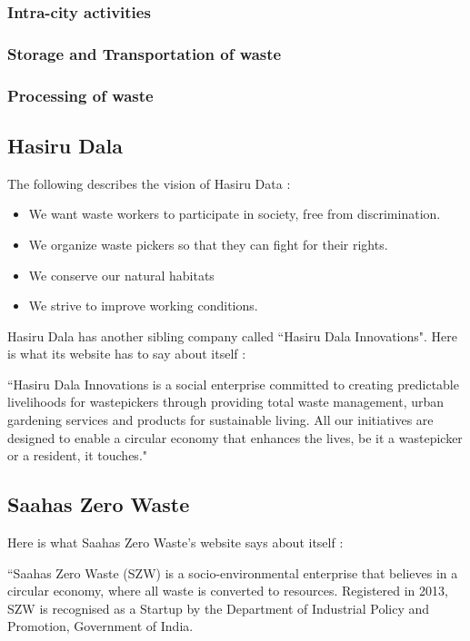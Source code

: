\documentclass[10pt]{article}
\begin{document}
\subsubsection{Intra-city activities}

\subsubsection{Storage and Transportation of waste}

\subsubsection{Processing of waste}

\subsection{Hasiru Dala}

The following describes the vision of Hasiru Data \citep{HasiruDala:home}:

\begin{itemize}
\item We want waste workers to participate in society, free from discrimination.
\item We organize waste pickers so that they can fight for their rights.
\item We conserve our natural habitats
\item We strive to improve working conditions.
\end{itemize}

Hasiru Dala has another sibling company called ``Hasiru Dala Innovations". Here is what its website has to say about itself \citep{HasiruDalaInnovations:about}:

``Hasiru Dala Innovations is a social enterprise committed to creating predictable livelihoods for wastepickers through providing total waste management, urban gardening services and products for sustainable living. All our initiatives are designed to enable a circular economy that enhances the lives, be it a wastepicker or a resident, it touches."

\subsection{Saahas Zero Waste}

Here is what Saahas Zero Waste's website says about itself \citep{SaahasZeroWaste:about}:

``Saahas Zero Waste (SZW) is a socio-environmental enterprise that believes in a circular economy, where all waste is converted to resources. Registered in 2013, SZW is recognised as a Startup by the Department of Industrial Policy and Promotion, Government of India.
\end{document}
